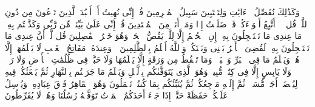 \stopbuffer
\startbuffer[\q:6:55]
وَكَذَٰلِكَ نُفَصِّلُ ٱلۡءَایَٰتِ وَلِتَسۡتَبِینَ سَبِیلُ ٱلۡمُجۡرِمِینَ%
\stopbuffer
\startbuffer[\q:6:56]
قُلۡ إِنِّی نُهِیتُ أَنۡ أَعۡبُدَ ٱلَّذِینَ تَدۡعُونَ مِن دُونِ ٱللَّهِۚ قُل لَّاۤ أَتَّبِعُ أَهۡوَاۤءَكُمۡ قَدۡ ضَلَلۡتُ إِذࣰا وَمَاۤ أَنَا۠ مِنَ ٱلۡمُهۡتَدِینَ%
\stopbuffer
\startbuffer[\q:6:57]
قُلۡ إِنِّی عَلَىٰ بَیِّنَةࣲ مِّن رَّبِّی وَكَذَّبۡتُم بِهِۦۚ مَا عِندِی مَا تَسۡتَعۡجِلُونَ بِهِۦۤۚ إِنِ ٱلۡحُكۡمُ إِلَّا لِلَّهِۖ یَقُصُّ ٱلۡحَقَّۖ وَهُوَ خَیۡرُ ٱلۡفَٰصِلِینَ%
\stopbuffer
\startbuffer[\q:6:58]
قُل لَّوۡ أَنَّ عِندِی مَا تَسۡتَعۡجِلُونَ بِهِۦ لَقُضِیَ ٱلۡأَمۡرُ بَیۡنِی وَبَیۡنَكُمۡۗ وَٱللَّهُ أَعۡلَمُ بِٱلظَّٰلِمِینَ%
\stopbuffer
\startbuffer[\q:6:59]
۞ وَعِندَهُۥ مَفَاتِحُ ٱلۡغَیۡبِ لَا یَعۡلَمُهَاۤ إِلَّا هُوَۚ وَیَعۡلَمُ مَا فِی ٱلۡبَرِّ وَٱلۡبَحۡرِۚ وَمَا تَسۡقُطُ مِن وَرَقَةٍ إِلَّا یَعۡلَمُهَا وَلَا حَبَّةࣲ فِی ظُلُمَٰتِ ٱلۡأَرۡضِ وَلَا رَطۡبࣲ وَلَا یَابِسٍ إِلَّا فِی كِتَٰبࣲ مُّبِینࣲ%
\stopbuffer
\startbuffer[\q:6:60]
وَهُوَ ٱلَّذِی یَتَوَفَّىٰكُم بِٱلَّیۡلِ وَیَعۡلَمُ مَا جَرَحۡتُم بِٱلنَّهَارِ ثُمَّ یَبۡعَثُكُمۡ فِیهِ لِیُقۡضَىٰۤ أَجَلࣱ مُّسَمࣰّىۖ ثُمَّ إِلَیۡهِ مَرۡجِعُكُمۡ ثُمَّ یُنَبِّئُكُم بِمَا كُنتُمۡ تَعۡمَلُونَ%
\stopbuffer
\startbuffer[\q:6:61]
وَهُوَ ٱلۡقَاهِرُ فَوۡقَ عِبَادِهِۦۖ وَیُرۡسِلُ عَلَیۡكُمۡ حَفَظَةً حَتَّىٰۤ إِذَا جَاۤءَ أَحَدَكُمُ ٱلۡمَوۡتُ تَوَفَّتۡهُ رُسُلُنَا وَهُمۡ لَا یُفَرِّطُونَ%
\stopbuffer
